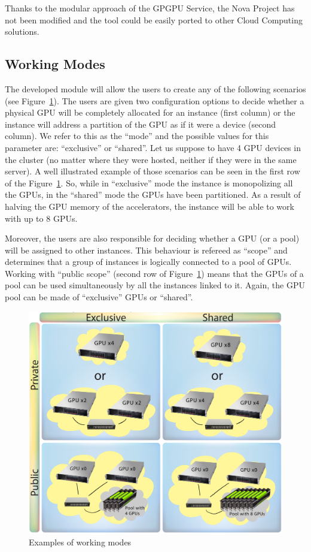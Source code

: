 \documentclass[a4paper,twoside]{article}
\begin{document}
Thanks to the modular approach of the GPGPU Service, the Nova Project has not been modified and the tool could be easily ported to other Cloud Computing solutions.

\subsection{Working Modes}
The developed module will allow the users to create any of the following scenarios (see Figure~\ref{fig2}). 
The users are given two configuration options to decide whether a physical GPU will be completely allocated for an instance (first column) or the instance will address a partition of the GPU as if it were a device (second column).
We refer to this as the ``mode'' and the possible values for this parameter are: ``exclusive'' or ``shared''. 
Let us suppose to have 4 GPU devices in the cluster (no matter where they were hosted, neither if they were in the same server). 
A well illustrated example of those scenarios can be seen in the first row of the  Figure~\ref{fig2}.
So, while in ``exclusive'' mode the instance is monopolizing all the GPUs, in the ``shared'' mode the GPUs have been partitioned. 
As a result of halving the GPU memory of the accelerators, the instance will be able to work with up to 8 GPUs.

Moreover, the users are also responsible for deciding whether a GPU (or a pool) will be assigned to other instances. 
This behaviour is refereed as ``scope'' and determines that a group of instances is logically connected to a pool of GPUs.
Working with ``public scope'' (second row of Figure~\ref{fig2}) means that the GPUs of a pool can be used simultaneously by all the instances linked to it.
Again, the GPU pool can be made of ``exclusive'' GPUs or ``shared''.

\begin{figure}[!t]
  \centering
  \includegraphics[width=.5\textwidth]{images/workingmodes.jpg}
  \caption{Examples of working modes}
  \label{fig2}
\end{figure}
\end{document}
